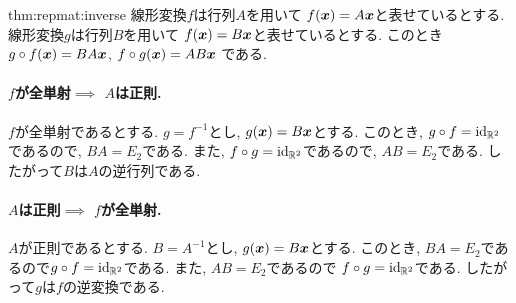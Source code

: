 \begin{proofof}{thm:repmat:inverse}
  線形変換$f$は行列$A$を用いて
  $f(\boldsymbol{x})=A\boldsymbol{x}$と表せているとする.
  線形変換$g$は行列$B$を用いて
  $f(\boldsymbol{x})=B\boldsymbol{x}$と表せているとする.
  このとき
  $g\circ f(\boldsymbol{x})=BA\boldsymbol{x}$,
  $f\circ g(\boldsymbol{x})=AB\boldsymbol{x}$
  である.

  \paragraph{$f$が全単射$\implies$ $A$は正則.}
  $f$が全単射であるとする.
  $g=f^{-1}$とし, $g(\boldsymbol{x})=B\boldsymbol{x}$とする.
  このとき,
  $g\circ f=\operatorname{id}_{\mathbb{R}^2}$であるので,
  $BA=E_2$である.
  また,
  $f\circ g=\operatorname{id}_{\mathbb{R}^2}$であるので,
  $AB=E_2$である.
  したがって$B$は$A$の逆行列である.
  
  \paragraph{$A$は正則$\implies$ $f$が全単射.}
  $A$が正則であるとする.
  $B=A^{-1}$とし, $g(\boldsymbol{x})=B\boldsymbol{x}$とする.
  このとき,
  $BA=E_2$であるので$g\circ f=\operatorname{id}_{\mathbb{R}^2}$である.
  また,
  $AB=E_2$であるので
  $f\circ g=\operatorname{id}_{\mathbb{R}^2}$である.
  したがって$g$は$f$の逆変換である.
  
\end{proofof}
